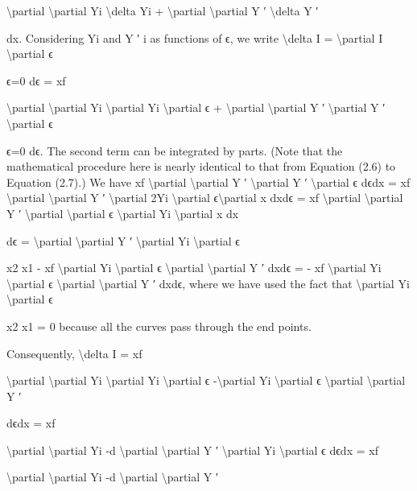 \textbackslash{}partial
\textbackslash{}partial Yi
\textbackslash{}delta Yi + \textbackslash{}partial
\textbackslash{}partial Y ′
\textbackslash{}delta Y ′

dx.
Considering Yi and Y ′
i as functions of ϵ, we write
\textbackslash{}delta I =
\textbackslash{}partial I
\textbackslash{}partial ϵ

ϵ=0
dϵ =
xf

\textbackslash{}partial
\textbackslash{}partial Yi
\textbackslash{}partial Yi
\textbackslash{}partial ϵ + \textbackslash{}partial
\textbackslash{}partial Y ′
\textbackslash{}partial Y ′
\textbackslash{}partial ϵ


ϵ=0
dϵ.
The second term can be integrated by parts. (Note that the mathematical procedure here is nearly identical to that from Equation (2.6) to Equation (2.7).)
We have
xf
\textbackslash{}partial
\textbackslash{}partial Y ′
\textbackslash{}partial Y ′
\textbackslash{}partial ϵ dϵdx =
xf
\textbackslash{}partial
\textbackslash{}partial Y ′
\textbackslash{}partial 2Yi
\textbackslash{}partial ϵ\textbackslash{}partial x dxdϵ =
xf
\textbackslash{}partial
\textbackslash{}partial Y ′
\textbackslash{}partial
\textbackslash{}partial ϵ
\textbackslash{}partial Yi
\textbackslash{}partial x dx

dϵ
= \textbackslash{}partial
\textbackslash{}partial Y ′
\textbackslash{}partial Yi
\textbackslash{}partial ϵ

x2
x1
-
xf
\textbackslash{}partial Yi
\textbackslash{}partial ϵ
\textbackslash{}partial
\textbackslash{}partial Y ′
dxdϵ
= -
xf
\textbackslash{}partial Yi
\textbackslash{}partial ϵ
\textbackslash{}partial
\textbackslash{}partial Y ′
dxdϵ,
where we have used the fact that \textbackslash{}partial Yi
\textbackslash{}partial ϵ

x2
x1
= 0 because all the curves pass through
the end points.

Consequently,
\textbackslash{}delta I =
xf

\textbackslash{}partial
\textbackslash{}partial Yi
\textbackslash{}partial Yi
\textbackslash{}partial ϵ -\textbackslash{}partial Yi
\textbackslash{}partial ϵ
\textbackslash{}partial
\textbackslash{}partial Y ′

dϵdx
=
xf

\textbackslash{}partial
\textbackslash{}partial Yi
-d
\textbackslash{}partial
\textbackslash{}partial Y ′
\textbackslash{}partial Yi
\textbackslash{}partial ϵ dϵdx
=
xf

\textbackslash{}partial
\textbackslash{}partial Yi
-d
\textbackslash{}partial
\textbackslash{}partial Y ′

